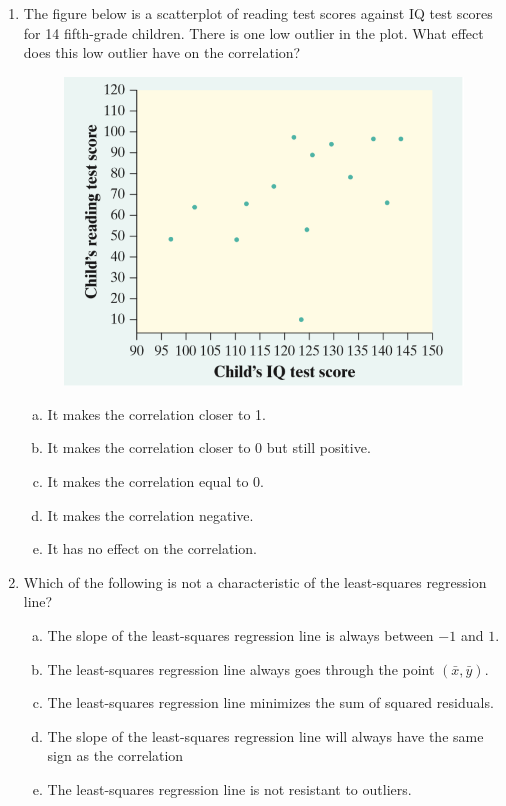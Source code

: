 \documentclass[a4paper,12pt,twoside]{book}
\begin{document}
\begin{enumerate}
 \item The figure below is a scatterplot of reading test scores against IQ test scores for 14 fifth-grade children. There is one low outlier in the plot. What effect does this low outlier have on the correlation?
     \begin{figure}[H]
     \centering
     \includegraphics[scale=0.5]{figure0204}
     \end{figure}
     
     \begin{enumerate}[(a)]
         \item It makes the correlation closer to 1.
         \item It makes the correlation closer to 0 but still positive.
         \item It makes the correlation equal to 0.
         \item It makes the correlation negative.
         \item It has no effect on the correlation.
     \end{enumerate}
     \vspace{0.3cm}
     
 \item Which of the following is not a characteristic of the least-squares regression line?
     \begin{enumerate}[(a)]
         \item The slope of the least-squares regression line is always between $-1$ and $1$.
         \item The least-squares regression line always goes through the point $(\bar{x}, \bar{y})$.
         \item The least-squares regression line minimizes the sum of squared residuals.
         \item The slope of the least-squares regression line will always have the same sign as the correlation
         \item The least-squares regression line is not resistant to outliers.
     \end{enumerate}
     \vspace{0.3cm}
     

\end{enumerate}
\end{document}
